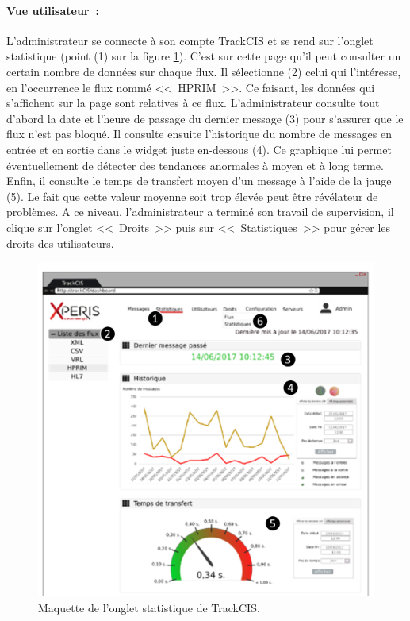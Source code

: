 			\paragraph{Vue utilisateur~:}
			L'administrateur se connecte à son compte TrackCIS et se rend sur l'onglet
			statistique (point (1) sur la figure \ref{maquette_user}). C'est sur cette
			page qu'il peut consulter un certain nombre de données sur chaque flux. Il
			sélectionne (2) celui qui l'intéresse, en l'occurrence le flux nommé
			<<~HPRIM~>>.
			Ce faisant, les données qui s'affichent sur la page sont relatives à ce flux.
			L'administrateur consulte tout d'abord la date et l'heure de passage du
			dernier message (3) pour s'assurer que le flux n'est pas bloqué. Il consulte ensuite
			l'historique du nombre de messages en entrée et en sortie dans le widget
			juste en-dessous (4). Ce graphique lui permet éventuellement de détecter des
			tendances anormales à moyen et à long terme. Enfin, il consulte le temps de
			transfert moyen d'un message à l'aide de la jauge (5). Le fait que cette
			valeur moyenne soit trop élevée peut être révélateur de problèmes. A ce
			niveau, l'administrateur a terminé son travail de supervision, il clique sur
			l'onglet <<~Droits~>> puis sur <<~Statistiques~>> pour gérer les droits des
			utilisateurs.
			\begin{figure}[H]
				\centering
				\includegraphics[width=16cm]{../img/part2/maquette_user_1.png}
				\caption{\label{maquette_user} Maquette de l'onglet statistique de
				TrackCIS.}
			\end{figure}
			
